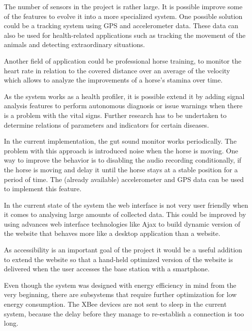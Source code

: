 The number of sensors in the project is rather large. It is possible improve some of the features to evolve it into a more specialized system. One possible solution could be a tracking system using GPS and accelerometer data. These data can also be used for health-related applications such as tracking the movement of the animals and detecting extraordinary situations. 

Another field of application could be professional horse training, to monitor the heart rate in relation to the covered distance over an average of the velocity which allows to analyze the improvements of a horse’s stamina over time.

As the system works as a health profiler, it is possible extend it by adding signal analysis features to perform autonomous diagnosis or issue warnings when there is a problem with the vital signs. Further research has to be undertaken to determine relations of parameters and indicators for certain diseases.

In the current implementation, the gut sound monitor works periodically. The problem with this approach is introduced noise when the horse is moving. One way to improve the behavior is to disabling the audio recording conditionally, if the horse is moving and delay it until the horse stays at a stable position for a period of time. The (already available) accelerometer and GPS data can be used to implement this feature.

In the current state of the system the web interface is not very user friendly when it comes to analysing large amounts of collected data. This could be improved by using advances web interface technologies like Ajax to build dynamic version of the website that behaves more like a desktop application than a website.

As accessibility is an important goal of the project it would be a useful addition to extend the website so that a hand-held optimized version of the website is delivered when the user accesses the base station with a smartphone.


Even though the system was designed with energy efficiency in mind from the very beginning, there are subsystems that require further optimization for low energy consumption. The XBee devices are not sent to sleep in the current system, because the delay before they manage to re-establish a connection is too long.  